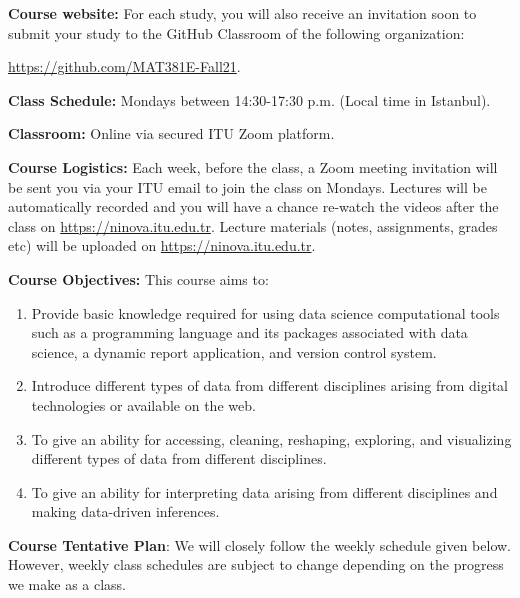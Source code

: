 \documentclass[
  12pt,
]{article}
\providecommand{\tightlist}{%
  \setlength{\itemsep}{0pt}\setlength{\parskip}{0pt}}
\begin{document}
\textbf{Course website:} For each study, you will also receive an
invitation soon to submit your study to the GitHub Classroom of the
following organization:

\url{https://github.com/MAT381E-Fall21}.

\textbf{Class Schedule:} Mondays between 14:30-17:30 p.m. (Local time in
Istanbul).

\textbf{Classroom:} Online via secured ITU Zoom platform.

\textbf{Course Logistics:} Each week, before the class, a Zoom meeting
invitation will be sent you via your ITU email to join the class on
Mondays. Lectures will be automatically recorded and you will have a
chance re-watch the videos after the class on
\url{https://ninova.itu.edu.tr}. Lecture materials (notes, assignments,
grades etc) will be uploaded on \url{https://ninova.itu.edu.tr}.

\textbf{Course Objectives:} This course aims to:

\begin{enumerate}
\def\labelenumi{\arabic{enumi}.}
\tightlist
\item
  Provide basic knowledge required for using data science computational
  tools such as a programming language and its packages associated with
  data science, a dynamic report application, and version control
  system.
\item
  Introduce different types of data from different disciplines arising
  from digital technologies or available on the web.
\item
  To give an ability for accessing, cleaning, reshaping, exploring, and
  visualizing different types of data from different disciplines.
\item
  To give an ability for interpreting data arising from different
  disciplines and making data-driven inferences.
\end{enumerate}

\textbf{Course Tentative Plan}: We will closely follow the weekly
schedule given below. However, weekly class schedules are subject to
change depending on the progress we make as a class.
\end{document}
